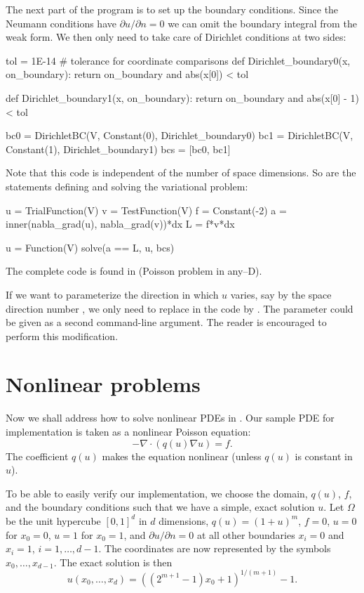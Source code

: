 The next part of the program is to set up the boundary conditions.
Since the Neumann conditions have $\partial u/\partial n=0$ we can
omit the boundary integral from the weak form. We then only
need to take care of Dirichlet conditions at two sides:
\begin{python}
tol = 1E-14   # tolerance for coordinate comparisons
def Dirichlet_boundary0(x, on_boundary):
    return on_boundary and abs(x[0]) < tol

def Dirichlet_boundary1(x, on_boundary):
    return on_boundary and abs(x[0] - 1) < tol

bc0 = DirichletBC(V, Constant(0), Dirichlet_boundary0)
bc1 = DirichletBC(V, Constant(1), Dirichlet_boundary1)
bcs = [bc0, bc1]
\end{python}
Note that this code is independent of the number of space dimensions.
So are the statements defining and solving
the variational problem:
\begin{python}
u = TrialFunction(V)
v = TestFunction(V)
f = Constant(-2)
a = inner(nabla_grad(u), nabla_grad(v))*dx
L = f*v*dx

u = Function(V)
solve(a == L, u, bcs)
\end{python}
The complete code is found in  (Poisson problem in any--D).

If we want to parameterize the direction in which $u$ varies, say by
the space direction number , we only need to replace 
in the code by . The parameter  could be given as a
second command-line argument.  The reader is encouraged to perform
this modification.

\section{Nonlinear problems}
\label{langtangen:poisson:nonlinear}

Now we shall address how to solve nonlinear PDEs in \fenics. Our
sample PDE for implementation is taken as a nonlinear Poisson
equation:
\begin{equation}
-\nabla\cdot\left( q(u)\nabla u\right) = f.
\end{equation}
The coefficient $q(u)$ makes the equation nonlinear (unless $q(u)$
is constant in $u$).

To be able to easily verify our implementation, we choose the domain,
$q(u)$, $f$, and the boundary conditions such that we have a simple,
exact solution $u$. Let $\Omega$ be the unit hypercube $[0, 1]^d$ in
$d$ dimensions, $q(u)=(1+u)^m$, $f=0$, $u=0$ for $x_0=0$, $u=1$ for
$x_0=1$, and $\partial u/\partial n=0$ at all other boundaries $x_i=0$
and $x_i=1$, $i=1,\ldots,d-1$. The coordinates are now represented by
the symbols $x_0,\ldots,x_{d-1}$. The exact solution is then
\begin{equation}
u(x_0,\ldots,x_d) = \left((2^{m+1}-1)x_0 + 1\right)^{1/(m+1)} - 1.
\end{equation}

